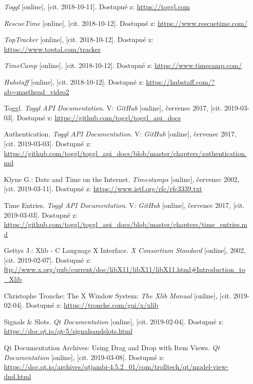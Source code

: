 \documentclass[thesis=B,czech]{FITthesis}[2012/06/26]
\begin{document}


\begin{thebibliography}{15}
	 \textit{Toggl} [online], [cit. 2018-10-11]. Dostupné z: \url{https://toggl.com}
	
	 \textit{RescueTime} [online], [cit. 2018-10-12]. Dostupné z: \url{https://www.rescuetime.com/}
	
	 \textit{TopTracker} [online], [cit. 2018-10-12]. Dostupné z: \url{https://www.toptal.com/tracker}
	
	 \textit{TimeCamp} [online], [cit. 2018-10-12]. Dostupné z: \url{https://www.timecamp.com/}
	
	 \textit{Hubstaff} [online], [cit. 2018-10-12]. Dostupné z: \url{https://hubstaff.com/?ab=masthead\_video2}
	
	 Toggl. \textit{Toggl API Documentation}. V: \textit{GitHub} [online], červenec 2017, [cit. 2019-03-03]. Dostupné z: \url{https://github.com/toggl/toggl\_api\_docs}

		
	 Authentication. \textit{Toggl API Documentation}. V: \textit{GitHub} [online], červenec 2017, [cit. 2019-03-03]. Dostupné z: \url{https://github.com/toggl/toggl\_api\_docs/blob/master/chapters/authentication.md}
	
	 Klyne G.: Date and Time on the Internet.  \textit{Timestamps} [online], červenec 2002, [cit. 2019-03-11]. Dostupné z: \url{https://www.ietf.org/rfc/rfc3339.txt}
		
	 Time Entries. \textit{Toggl API Documentation}. V: \textit{GitHub} [online], červenec 2017, [cit. 2019-03-03]. Dostupné z: \url{https://github.com/toggl/toggl\_api\_docs/blob/master/chapters/time\_entries.md}

	 Gettys J.: Xlib - C Language X Interface. \textit{X Consortium Standard} [online], 2002, [cit. 2019-02-07]. Dostupné z: \url{	ftp://www.x.org/pub/current/doc/libX11/libX11/libX11.html#Introduction\_to\_Xlib}
	
	 Christophe Tronche: The X Window System: \textit{The Xlib Manual} [online], [cit. 2019-02-04]. Dostupné z: \url{https://tronche.com/gui/x/xlib}
		
	  Signals \& Slots. \textit{Qt Documentation} [online], [cit. 2019-02-04]. Dostupné z: \url{https://doc.qt.io/qt-5/signalsandslots.html}	
	
	  Qt Documentation Archives: Using Drag and Drop with Item Views. \textit{Qt Documentation} [online], [cit. 2019-03-08]. Dostupné z: \url{https://doc.qt.io/archives/qtjambi-4.5.2\_01/com/trolltech/qt/model-view-dnd.html}
	

\end{thebibliography}
\end{document}
